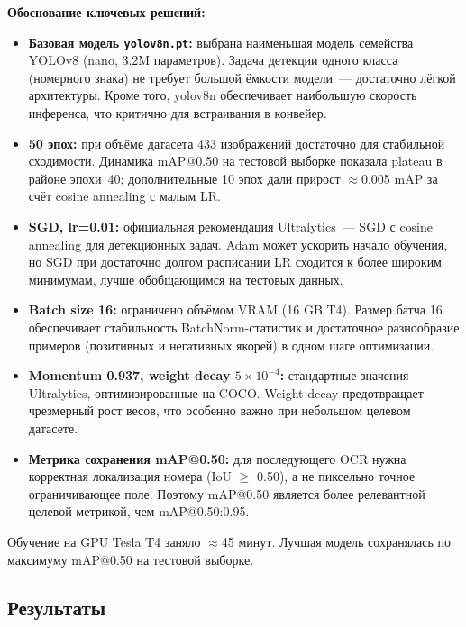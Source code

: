\documentclass[14pt,a4paper]{report}
\numberwithin{equation}{chapter}
\numberwithin{figure}{chapter}
\numberwithin{table}{chapter}
\begin{document}
\textbf{Обоснование ключевых решений:}
\begin{itemize}
  \item \textbf{Базовая модель \texttt{yolov8n.pt}:} выбрана наименьшая
    модель семейства YOLOv8 (nano, 3.2M параметров). Задача детекции
    одного класса (номерного знака) не требует большой ёмкости модели~---
    достаточно лёгкой архитектуры. Кроме того, yolov8n обеспечивает
    наибольшую скорость инференса, что критично для встраивания в конвейер.

  \item \textbf{50 эпох:} при объёме датасета 433 изображений
    достаточно для стабильной сходимости. Динамика mAP@0.50 на тестовой выборке показала
    plateau в районе эпохи~40; дополнительные 10 эпох дали прирост
    $\approx$0.005 mAP за счёт cosine annealing с малым LR.

  \item \textbf{SGD, lr=0.01:} официальная рекомендация Ultralytics~---
    SGD с cosine annealing для детекционных задач. Adam может ускорить
    начало обучения, но SGD при достаточно долгом расписании LR сходится
    к более широким минимумам, лучше обобщающимся на тестовых данных.

  \item \textbf{Batch size 16:} ограничено объёмом VRAM (16 GB T4).
    Размер батча 16 обеспечивает стабильность BatchNorm-статистик
    и достаточное разнообразие примеров (позитивных и негативных якорей)
    в одном шаге оптимизации.

  \item \textbf{Momentum 0.937, weight decay $5\!\times\!10^{-4}$:}
    стандартные значения Ultralytics, оптимизированные на COCO.
    Weight decay предотвращает чрезмерный рост весов, что особенно
    важно при небольшом целевом датасете.

  \item \textbf{Метрика сохранения mAP@0.50:} для последующего OCR
    нужна корректная локализация номера (IoU $\geq$ 0.50), а не
    пиксельно точное ограничивающее поле. Поэтому mAP@0.50 является
    более релевантной целевой метрикой, чем mAP@0.50:0.95.
\end{itemize}
Обучение на GPU Tesla T4 заняло $\approx$45 минут.
Лучшая модель сохранялась по максимуму mAP@0.50 на тестовой выборке.

\subsection{Результаты}
\end{document}
